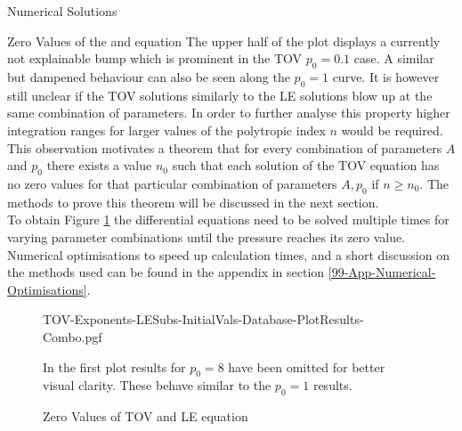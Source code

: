 \begin{section}{Numerical Solutions}
\begin{subsection}{Zero Values of the  and  equation}
The upper half of the plot displays a currently not explainable bump which is prominent in the \ac{TOV} $p_0=0.1$ case.
A similar but dampened behaviour can also be seen along the $p_0=1$ curve.
It is however still unclear if the \ac{TOV} solutions similarly to the \ac{LE} solutions blow up at the same combination of parameters.
In order to further analyse this property higher integration ranges for larger values of the polytropic index $n$ would be required.
This observation motivates a theorem that for every combination of parameters $A$ and $p_0$ there exists a value $n_0$ such that each solution of the TOV equation has no zero values for that particular combination of parameters $A,p_0$ if $n\geq n_0$.
The methods to prove this theorem will be discussed in the next section.\\
To obtain Figure \ref{4-NumSol-Plt-TOV-Exponents-Combo} the differential equations need to be solved multiple times for varying parameter combinations until the pressure reaches its zero value.
Numerical optimisations to speed up calculation times, and a short discussion on the methods used can be found in the appendix in section \ref{99-App-Numerical-Optimisations}.
\begin{figure}[H]
	\centering
	{TOV-Exponents-LESubs-InitialVals-Database-PlotResults-Combo.pgf}
	\caption{Zero Values of TOV and LE equation}
	\label{4-NumSol-Plt-TOV-Exponents-Combo}
	In the first plot results for $p_0=8$ have been omitted for better visual clarity.
	These behave similar to the $p_0=1$ results.
\end{figure}
\end{subsection}
%
%
\end{section}
